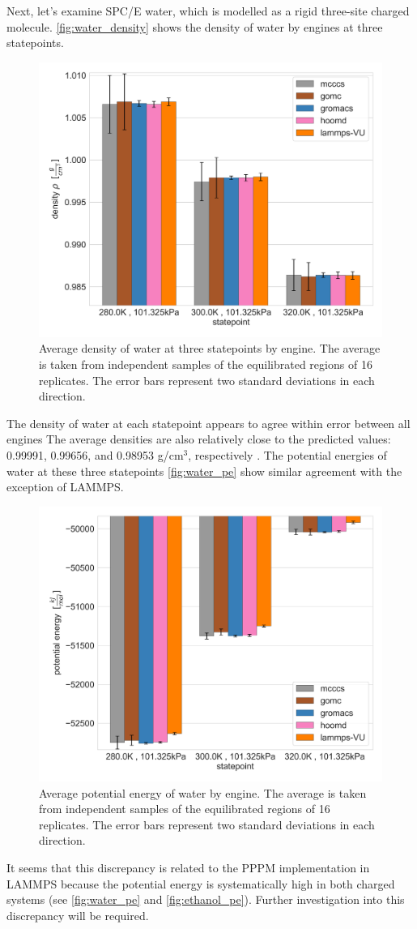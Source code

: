Next, let's examine SPC/E water, which is modelled as a rigid three-site charged molecule. 
\autoref{fig:water_density} shows the density of water by engines at three statepoints.
\begin{figure}[h!]
    \centering
    \includegraphics[width=0.6\linewidth,keepaspectratio]{figures/rep_study/waterSPCE_summary.png}
    \caption{Average density of water at three statepoints by engine. The average is taken from independent samples of the equilibrated regions of 16 replicates. The error bars represent two standard deviations in each direction.}\label{fig:water_density}
\end{figure}
The density of water at each statepoint appears to agree within error between all engines
The average densities are also relatively close to the predicted values: 0.99991, 0.99656, and 0.98953 g/cm$^3$, respectively \cite{NISTwebbook}.
The potential energies of water at these three statepoints \autoref{fig:water_pe} show similar agreement with the exception of LAMMPS.
\begin{figure}[h!]
    \centering
    \includegraphics[width=0.6\linewidth,keepaspectratio]{figures/rep_study/waterSPCE_pe_summary.png}
    \caption{Average potential energy of water by engine. The average is taken from independent samples of the equilibrated regions of 16 replicates. The error bars represent two standard deviations in each direction.}\label{fig:water_pe}
\end{figure}
It seems that this discrepancy is related to the PPPM implementation in LAMMPS because the potential energy is systematically high in both charged systems (see \autoref{fig:water_pe} and \autoref{fig:ethanol_pe}).
Further investigation into this discrepancy will be required.


